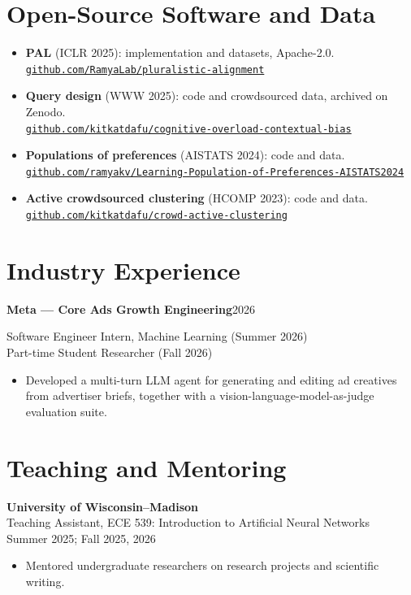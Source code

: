 \documentclass[11pt,letterpaper]{article}
\newcommand{\entry}[2]{\Needspace{4\baselineskip}\textbf{#1}\hfill #2\par}
\begin{document}
\section*{Open-Source Software and Data}
\begin{itemize}
\item \textbf{PAL} (ICLR 2025): implementation and datasets, Apache-2.0.\\
\href{https://github.com/RamyaLab/pluralistic-alignment}{\nolinkurl{github.com/RamyaLab/pluralistic-alignment}}
\item \textbf{Query design} (WWW 2025): code and crowdsourced data, archived on Zenodo.\\
\href{https://github.com/kitkatdafu/cognitive-overload-contextual-bias}{\nolinkurl{github.com/kitkatdafu/cognitive-overload-contextual-bias}}
\item \textbf{Populations of preferences} (AISTATS 2024): code and data.\\
\href{https://github.com/ramyakv/Learning-Population-of-Preferences-AISTATS2024}{\nolinkurl{github.com/ramyakv/Learning-Population-of-Preferences-AISTATS2024}}
\item \textbf{Active crowdsourced clustering} (HCOMP 2023): code and data.\\
\href{https://github.com/kitkatdafu/crowd-active-clustering}{\nolinkurl{github.com/kitkatdafu/crowd-active-clustering}}
\end{itemize}

\section*{Industry Experience}
\entry{Meta --- Core Ads Growth Engineering}{2026}
Software Engineer Intern, Machine Learning (Summer 2026)\\
Part-time Student Researcher (Fall 2026)
\begin{itemize}
\item Developed a multi-turn LLM agent for generating and editing ad creatives from advertiser briefs, together with a vision-language-model-as-judge evaluation suite.
\end{itemize}

\section*{Teaching and Mentoring}
\textbf{University of Wisconsin--Madison}\\
Teaching Assistant, ECE 539: Introduction to Artificial Neural Networks\\
Summer 2025; Fall 2025, 2026
\begin{itemize}
\item Mentored undergraduate researchers on research projects and scientific writing.
\end{itemize}
\end{document}
